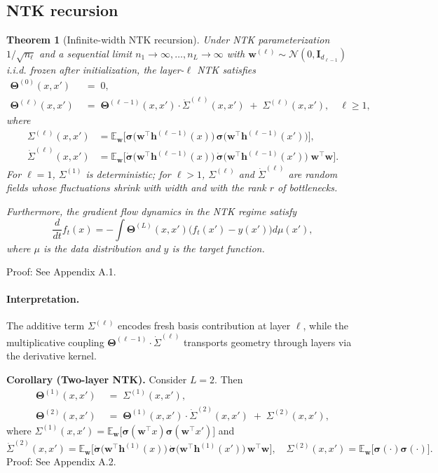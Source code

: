 \documentclass{article}
\DeclareRobustCommand{\ReLU}{\mathrel{\boldsymbol{\sigma}}}
\newcommand{\Kop}{\boldsymbol{\Theta}}
\newtheorem{theorem}{Theorem}
\begin{document}
\subsection{NTK recursion}
\begin{theorem}[Infinite-width NTK recursion]
\label{thm:ntk_recursion}
Under NTK parameterization \( 1/\sqrt{n_\ell} \) and a sequential limit \( n_1\to\infty,\dots,n_L\to\infty \) with \( \bm{w}^{(\ell)} \sim \mathcal{N}(0, \mathbf{I}_{d_{\ell-1}}) \) i.i.d. frozen after initialization, the layer-\( \ell \) NTK satisfies
\begin{align}
\Kop^{(0)}(x,x') \;&=\; 0, \\
\Kop^{(\ell)}(x,x') \;&=\; \Kop^{(\ell-1)}(x,x')\cdot\dot{\Sigma}^{(\ell)}(x,x')\;+\;\Sigma^{(\ell)}(x,x'),\quad \ell\ge1,
\end{align}
where
\begin{align}
\Sigma^{(\ell)}(x,x') &= \mathbb{E}_{\bm{w}}\Big[\ReLU\!\big(\bm{w}^\top \bm{h}^{(\ell-1)}(x)\big)\,\ReLU\!\big(\bm{w}^\top \bm{h}^{(\ell-1)}(x')\big)\Big], \\
\dot{\Sigma}^{(\ell)}(x,x') &= \mathbb{E}_{\bm{w}}\Big[\dot{\ReLU}\!\big(\bm{w}^\top \bm{h}^{(\ell-1)}(x)\big)\,\dot{\ReLU}\!\big(\bm{w}^\top \bm{h}^{(\ell-1)}(x')\big)\;\bm{w}^\top\bm{w}\Big].
\end{align}
For \( \ell=1 \), \( \Sigma^{(1)} \) is deterministic; for \( \ell>1 \), \( \Sigma^{(\ell)} \) and \( \dot{\Sigma}^{(\ell)} \) are random fields whose fluctuations shrink with width and with the rank \( r \) of bottlenecks.

Furthermore, the gradient flow dynamics in the NTK regime satisfy
\[
\frac{d}{dt}f_t(x) = -\int \Kop^{(L)}(x,x') \big(f_t(x') - y(x')\big) d\mu(x'),
\]
where \( \mu \) is the data distribution and \( y \) is the target function.
\end{theorem}

Proof: See Appendix A.1.

\paragraph{Interpretation.} The additive term \( \Sigma^{(\ell)} \) encodes fresh basis contribution at layer \( \ell \), while the multiplicative coupling \( \Kop^{(\ell-1)}\cdot\dot{\Sigma}^{(\ell)} \) transports geometry through layers via the derivative kernel.

\medskip
\noindent\textbf{Corollary (Two-layer NTK).}
Consider \( L=2 \). Then
\begin{align*}
\Kop^{(1)}(x,x') \;&=\; \Sigma^{(1)}(x,x'),\\
\Kop^{(2)}(x,x') \;&=\; \Kop^{(1)}(x,x')\cdot\dot{\Sigma}^{(2)}(x,x') \;+\; \Sigma^{(2)}(x,x'),
\end{align*}
where \( \Sigma^{(1)}(x,x')=\mathbb{E}_{\bm{w}}\big[\ReLU(\bm{w}^\top x)\ReLU(\bm{w}^\top x')\big] \) and
\[
\dot{\Sigma}^{(2)}(x,x')=\mathbb{E}_{\bm{w}}\Big[\dot{\ReLU}\!\big(\bm{w}^\top \bm{h}^{(1)}(x)\big)\,\dot{\ReLU}\!\big(\bm{w}^\top \bm{h}^{(1)}(x')\big)\,\bm{w}^\top\bm{w}\Big],\quad
\Sigma^{(2)}(x,x')=\mathbb{E}_{\bm{w}}\Big[\ReLU(\cdot)\ReLU(\cdot)\Big].
\]
Proof: See Appendix A.2.
\end{document}
